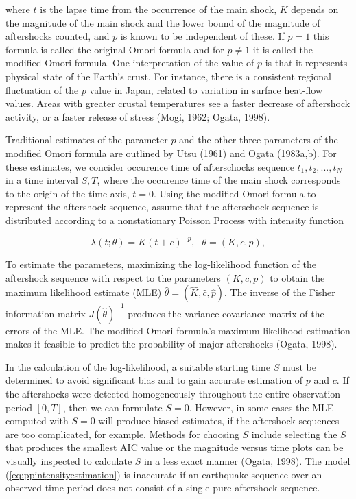 \documentclass[12pt]{article} %
\theoremstyle{plain}
\begin{document}
	\noindent where $t$ is the lapse time from the occurrence of the main shock, $K$ depends on the magnitude of the main shock and the lower bound of the magnitude of aftershocks counted, and $p$ is known to be independent of these. If $p=1$ this formula is called the original Omori formula and for $p\neq1$ it is called the modified Omori formula. One interpretation of the value of $p$ is that it represents physical state of the Earth's crust. For instance, there is a consistent regional fluctuation of the $p$ value in Japan, related to variation in surface heat-flow values. Areas with greater crustal temperatures see a faster decrease of aftershock activity, or a faster release of stress (Mogi, 1962; Ogata, 1998).
	
	Traditional estimates of the parameter $p$ and the other three parameters of the modified Omori formula are outlined by Utsu (1961) and Ogata (1983a,b). For these estimates, we concider occurence time of afterschocks sequence ${t_1, t_2,...,t_N}$ in a time interval ${S,T}$, where the occurence time of the main shock corresponds to the origin of the time axis, $t=0$. Using the modified Omori formula to represent the aftershock sequence, assume that the afterschock sequence is distributed according to a nonstationary Poisson Process with intensity function 
	
	\begin{equation} \label{eq:ppintensityestimation}
		\lambda(t;\theta)=K(t+c)^{-p}, \ \ \ \theta=(K,c,p),
	\end{equation}
	
	\noindent To estimate the parameters, maximizing the log-likelihood function of the aftershock sequence with respect to the parameters $(K,c,p)$ to obtain the maximum likelihood estimate (MLE) $\hat{\theta}=(\hat{K}, \hat{c}, \hat{p})$. The inverse of the Fisher information matrix $J(\hat{\theta})^{-1}$ produces the variance-covariance matrix of the errors of the MLE. The modified Omori formula's maximum likelihood estimation makes it feasible to predict the probability of major aftershocks (Ogata, 1998).
	
	
	In the calculation of the log-likelihood, a suitable starting time $S$ must be determined to avoid significant bias and to gain accurate estimation of $p$ and $c$. If the aftershocks were detected homogeneously throughout the entire observation period $[0, T]$, then we can formulate $S=0$. However, in some cases the MLE computed with $S=0$ will produce biased estimates, if the aftershock sequences are too complicated, for example. Methods for choosing $S$ include selecting the $S$ that produces the smallest AIC value or the magnitude versus time plots can be visually inspected to calculate $S$ in a less exact manner (Ogata, 1998). The model (\ref{eq:ppintensityestimation}) is inaccurate if an earthquake sequence over an observed time period does not consist of a single pure aftershock sequence.
\end{document}
